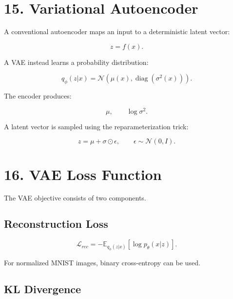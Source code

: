 \documentclass[10pt]{article}
\begin{document}
\section*{15. Variational Autoencoder}

A conventional autoencoder maps an input to a deterministic latent vector:

\[
z=f(x).
\]

A VAE instead learns a probability distribution:

\[
q_{\phi}(z|x)
=
\mathcal{N}
\left(
\mu(x),
\operatorname{diag}(\sigma^2(x))
\right).
\]

The encoder produces:

\[
\mu,\qquad \log\sigma^2.
\]

A latent vector is sampled using the reparameterization trick:

\[
z=\mu+\sigma\odot\epsilon,
\qquad
\epsilon\sim\mathcal{N}(0,I).
\]

\begin{center}
\end{center}

\section*{16. VAE Loss Function}

The VAE objective consists of two components.

\subsection*{Reconstruction Loss}

\[
\mathcal{L}_{rec}
=
-\mathbb{E}_{q_{\phi}(z|x)}
[\log p_{\theta}(x|z)].
\]

For normalized MNIST images, binary cross-entropy can be used.

\subsection*{KL Divergence}
\end{document}
